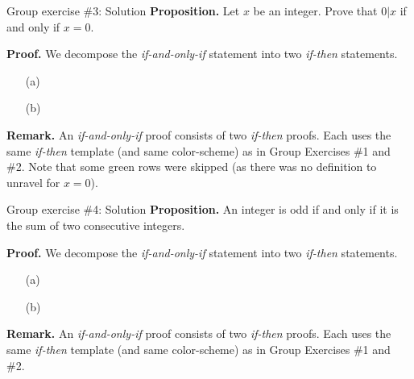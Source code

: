 \documentclass[10pt]{beamer}
\begin{document}
\begin{frame}{Group exercise \#3: Solution}
\small 
\textbf{Proposition.} Let $x$ be an integer.  Prove that $0|x$ if and only if $x=0$.

\textbf{Proof.} We decompose the \textit{if-and-only-if} statement into two \textit{if-then} statements.

\begin{itemize}
\item[(a)]        
\item [(b)]         	
\end{itemize}
\pause 
\vfill 
\textbf{Remark.} An \textit{if-and-only-if} proof consists of two \textit{if-then} proofs. Each uses the same \textit{if-then} template (and same color-scheme) as in Group Exercises \#1 and \#2.   Note that some green rows were skipped (as there was no definition to unravel for $x=0$).
\end{frame}

\begin{frame}{Group exercise \#4: Solution}
\footnotesize 
\textbf{Proposition.}
An integer is odd if and only if it is the sum of two consecutive integers.
 
\textbf{Proof.} We decompose the \textit{if-and-only-if} statement into two \textit{if-then} statements.

\begin{itemize}
\item [(a)]           	
\item[(b)]          
\end{itemize}

\pause 
\vfill 
\textbf{Remark.} An \textit{if-and-only-if} proof consists of two \textit{if-then} proofs. Each uses the same \textit{if-then} template (and same color-scheme) as in Group Exercises \#1 and \#2. 
\end{frame}
\end{document}
